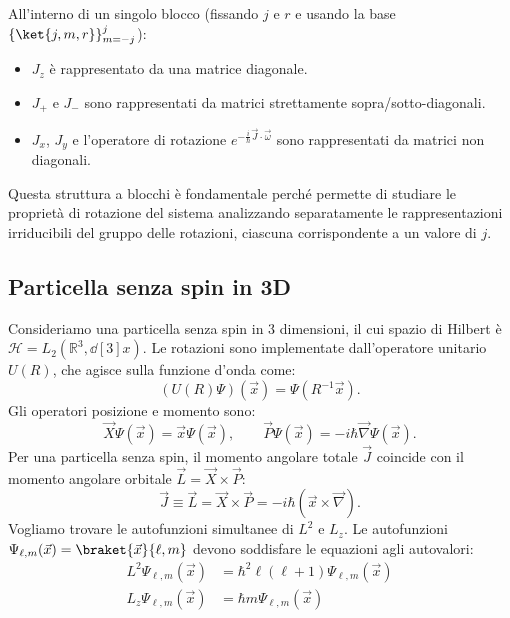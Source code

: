 All'interno di un singolo blocco (fissando \(j\) e \(r\) e usando la base \(\{\ket{j,m,r}\}_{m=-j}^j\)):
\begin{itemize}
    \item \(J_z\) è rappresentato da una matrice diagonale.
    \item \(J_+\) e \(J_-\) sono rappresentati da matrici strettamente sopra/sotto-diagonali.
    \item \(J_x\), \(J_y\) e l'operatore di rotazione \(e^{-\frac{i}{\hbar} \vec{J} \cdot \vec{\omega}}\) sono rappresentati da matrici non diagonali.
\end{itemize}
Questa struttura a blocchi è fondamentale perché permette di studiare le proprietà di rotazione del sistema analizzando separatamente le rappresentazioni irriducibili del gruppo delle rotazioni, ciascuna corrispondente a un valore di \(j\).

\subsection{Particella senza spin in 3D}
\label{sec: particella3d}


Consideriamo una particella senza spin in 3 dimensioni, il cui spazio di Hilbert è \( \mathcal{H} = L_2(\mathbb{R}^3, \dd[3]{x}) \).
Le rotazioni sono implementate dall'operatore unitario \( U(R) \), che agisce sulla funzione d'onda come:
\begin{equation}
    (U(R)\Psi)(\vec{x}) = \Psi(R^{-1}\vec{x}).
\end{equation}
Gli operatori posizione e momento sono:
\begin{equation}
    \vec{X}\Psi(\vec{x}) = \vec{x}\Psi(\vec{x}), \qquad \vec{P}\Psi(\vec{x}) = -i\hbar\vec{\nabla}\Psi(\vec{x}).
\end{equation}
Per una particella senza spin, il momento angolare totale \( \vec{J} \) coincide con il momento angolare orbitale \( \vec{L} = \vec{X} \times \vec{P} \):
\begin{equation}
    \vec{J} \equiv \vec{L} = \vec{X} \times \vec{P} = -i\hbar (\vec{x} \times \vec{\nabla}).
\end{equation}
Vogliamo trovare le autofunzioni simultanee di \( L^2 \) e \( L_z \).
Le autofunzioni \( \Psi_{\ell,m}(\vec{x}) = \braket{\vec{x}}{\ell,m} \) devono soddisfare le equazioni agli autovalori:
\begin{align}
    L^2 \Psi_{\ell,m}(\vec{x}) &= \hbar^2 \ell(\ell+1) \Psi_{\ell,m}(\vec{x}) \\
    L_z \Psi_{\ell,m}(\vec{x}) &= \hbar m \Psi_{\ell,m}(\vec{x})
\end{align}

